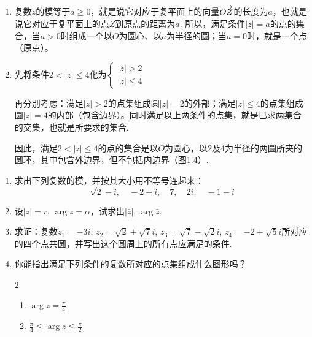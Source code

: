 \begin{solution}
\begin{enumerate}[(1)]
    \item 复数$z$的模等于$a\ge 0$，就是说它对应于复平面上的向量$\overrightarrow{OZ}$的长度为$a$，也就是说它对应于复平面上的点$Z$到原点的距离为$a$. 所以，满足条件$|z|=a$的点的集合，当$a>0$时组成一个以$O$为圆心、以$a$为半径的圆；当$a=0$时，就是一个点（原点）。
\item 先将条件$2<|z|\le 4$化为$\begin{cases}
    |z|>2\\ |z|\le 4
\end{cases}$

\begin{minipage}{.45\textwidth}
 再分别考虑：满足$|z|>2$的点集组成圆$|z|=2$的外部；满足$|z|\le 4$的点集组成圆$|z|=4$的内部（包含边界）。同时满足以上两条件的点集，就是已求两集合的交集，也就是所要求的集合.

因此，满足$2<|z|\le 4$的点的集合是以$O$为圆心，以2及4为半径的两圆所夹的圆环，其中包含外边界，但不包括内边界（图1.4）.   
\end{minipage}\hfill
\begin{minipage}{.45\textwidth}
    \centering
{}
\end{minipage}

\end{enumerate}    
\end{solution}

\begin{ex}
\begin{enumerate}
    \item 求出下列复数的模，并按其大小用不等号连起来：
\[\sqrt{2}-i,\quad -2+i,\quad 7,\quad 2i,\quad -1-i\]
  \item   设$|z|=r$, $\arg z=\alpha$，试求出$|\bar z|$, $\arg \bar z$.
  \item 求证：复数$z_1=-3i$, $z_2=\sqrt{2}+\sqrt{7}i$, $z_3=\sqrt{7}-\sqrt{2}i$, $z_4=-2+\sqrt{5}i$所对应的四个点共圆，并写出这个圆周上的所有点应满足的条件.
\item   你能指出满足下列条件的复数所对应的点集组成什么图形吗？
\begin{multicols}{2}
\begin{enumerate}[(1)]
    \item $\arg z=\frac{\pi}{4}$
    \item $\frac{\pi}{4}\le \arg z\le \frac{\pi}{2}$
\end{enumerate}
\end{multicols}
\end{enumerate}

\end{ex}

